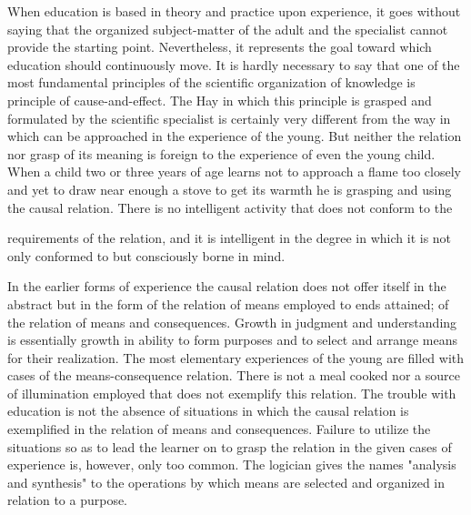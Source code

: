 When education is based in theory and practice upon experience, it goes without 
saying that the organized subject-matter of the adult and the specialist cannot provide the 
starting point. Nevertheless, it represents the goal toward which education should 
continuously move. It is hardly necessary to say that one of the most fundamental 
principles of the scientific organization of knowledge is principle of cause-and-effect. 
The Hay in which this principle is grasped and formulated by the scientific specialist is 
certainly very different from the way in which can be approached in the experience of the 
young. But neither the relation nor grasp of its meaning is foreign to the experience of 
even the young child. When a child two or three years of age learns not to approach a 
flame too closely and yet to draw near enough a stove to get its warmth he is grasping 
and using the causal relation. There is no intelligent activity that does not conform to the 



requirements of the relation, and it is intelligent in the degree in which it is not only 
conformed to but consciously borne in mind. 

In the earlier forms of experience the causal relation does not offer itself in the 
abstract but in the form of the relation of means employed to ends attained; of the relation 
of means and consequences. Growth in judgment and understanding is essentially growth 
in ability to form purposes and to select and arrange means for their realization. The most 
elementary experiences of the young are filled with cases of the means-consequence 
relation. There is not a meal cooked nor a source of illumination employed that does not 
exemplify this relation. The trouble with education is not the absence of situations in 
which the causal relation is exemplified in the relation of means and consequences. 
Failure to utilize the situations so as to lead the learner on to grasp the relation in the 
given cases of experience is, however, only too common. The logician gives the names 
"analysis and synthesis" to the operations by which means are selected and organized in 
relation to a purpose. 

